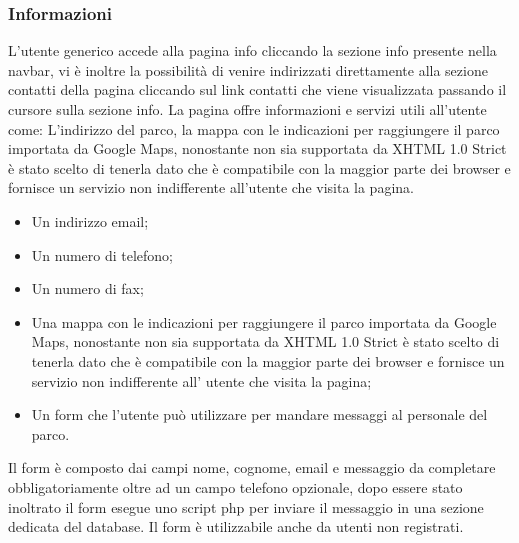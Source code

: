             \subsubsection{Informazioni}
            L’utente generico accede alla pagina info cliccando la sezione info presente nella navbar, vi è inoltre la possibilità di venire indirizzati direttamente alla sezione contatti della pagina cliccando sul link contatti che viene visualizzata passando il cursore sulla sezione info. La pagina offre informazioni e servizi utili all’utente come:
            L’indirizzo del parco, la mappa con le indicazioni per raggiungere il parco importata da Google Maps, nonostante non sia supportata da XHTML 1.0 Strict è stato scelto di tenerla dato che è compatibile con la maggior parte dei browser e fornisce un servizio non indifferente all’utente che visita la pagina.
            \begin{itemize}
                \item Un indirizzo email;
                \item Un numero di telefono;
                \item Un numero di fax;
                \item Una mappa con le indicazioni per raggiungere il parco importata da Google Maps, nonostante non sia supportata da XHTML 1.0 Strict è stato scelto di tenerla dato che è compatibile con la maggior parte dei browser e fornisce un servizio non indifferente all’ utente che visita la pagina;
                \item Un form che l’utente può utilizzare per mandare messaggi al personale del parco.
            \end{itemize}
            Il form è composto dai campi nome, cognome, email e messaggio da completare obbligatoriamente oltre ad un campo telefono opzionale, dopo essere stato inoltrato il form esegue uno script php per inviare il messaggio in una sezione dedicata del database. Il form è utilizzabile anche da utenti non registrati.

